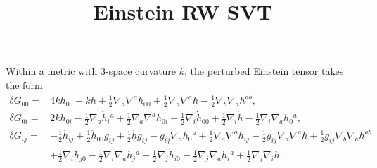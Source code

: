 \documentclass[10pt,letterpaper]{article}
\title{Einstein RW SVT}
\date{}
\begin{document}
\maketitle
\noindent 
Within a metric with 3-space curvature $k$, the perturbed Einstein tensor takes the form
\begin{align}
\delta G_{00}={}&4 k h_{00}
 + k h
 + \tfrac{1}{2} \nabla_{a}\nabla^{a}h_{00}
 + \tfrac{1}{2} \nabla_{a}\nabla^{a}h
 -  \tfrac{1}{2} \nabla_{b}\nabla_{a}h^{ab},
\\
\delta G_{0i}={}&2 k h_{0i}
 -  \tfrac{1}{2} \nabla_{a}\dot{h}_{i}{}^{a}
 + \tfrac{1}{2} \nabla_{a}\nabla^{a}h_{0i}
 + \tfrac{1}{2} \nabla_{i}\dot{h}_{00}
 + \tfrac{1}{2} \nabla_{i}\dot{h}
 -  \tfrac{1}{2} \nabla_{i}\nabla_{a}h_{0}{}^{a},
\\
\delta G_{ij}={}&- \tfrac{1}{2} \ddot{h}_{ij}
 + \tfrac{1}{2} \ddot{h}_{00} g_{ij}
 + \tfrac{1}{2} \ddot{h} g_{ij}
 -  g_{ij} \nabla_{a}\dot{h}_{0}{}^{a}
 + \tfrac{1}{2} \nabla_{a}\nabla^{a}h_{ij}
 -  \tfrac{1}{2} g_{ij} \nabla_{a}\nabla^{a}h
 + \tfrac{1}{2} g_{ij} \nabla_{b}\nabla_{a}h^{ab}\nonumber\\
& + \tfrac{1}{2} \nabla_{i}\dot{h}_{j0}
 -  \tfrac{1}{2} \nabla_{i}\nabla_{a}h_{j}{}^{a}
 + \tfrac{1}{2} \nabla_{j}\dot{h}_{i0}
 -  \tfrac{1}{2} \nabla_{j}\nabla_{a}h_{i}{}^{a}
 + \tfrac{1}{2} \nabla_{j}\nabla_{i}h.
\end{align}
\end{document}
